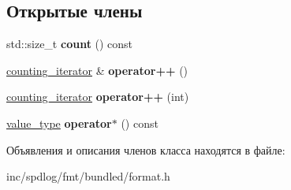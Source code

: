 \subsection*{Открытые члены}
\begin{DoxyCompactItemize}
\item 
\mbox{\label{classinternal_1_1counting__iterator_a7b69a621da48bbf6367f409707217906}} 
std\+::size\+\_\+t {\bfseries count} () const
\item 
\mbox{\label{classinternal_1_1counting__iterator_aefa4640811cad1040e81ba5786ecf5e3}} 
\hyperlink{classinternal_1_1counting__iterator}{counting\+\_\+iterator} \& {\bfseries operator++} ()
\item 
\mbox{\label{classinternal_1_1counting__iterator_a5dfbb2bc458bf1da08f5937a7da94a71}} 
\hyperlink{classinternal_1_1counting__iterator}{counting\+\_\+iterator} {\bfseries operator++} (int)
\item 
\mbox{\label{classinternal_1_1counting__iterator_a920fa528a2facc47caf30de27f8bb7bd}} 
\hyperlink{structinternal_1_1counting__iterator_1_1value__type}{value\+\_\+type} {\bfseries operator$\ast$} () const
\end{DoxyCompactItemize}


Объявления и описания членов класса находятся в файле\+:\begin{DoxyCompactItemize}
\item 
inc/spdlog/fmt/bundled/format.\+h\end{DoxyCompactItemize}

